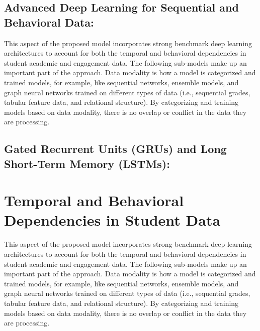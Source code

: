 \documentclass[twocolumn]{svjour3}
\begin{document}
\subsection{Advanced Deep Learning for Sequential and Behavioral Data:}
This aspect of the proposed model incorporates strong benchmark deep learning architectures to account for both the temporal and behavioral dependencies in student academic and engagement data. The following sub-models make up an important part of the approach. Data modality is how a model is categorized and trained models, for example, like sequential networks, ensemble models, and graph neural networks trained on different types of data (i.e., sequential grades, tabular feature data, and relational structure). By categorizing and training models based on data modality, there is no overlap or conflict in the data they are processing.
\subsection{Gated Recurrent Units (GRUs) and Long Short-Term Memory (LSTMs):}

\section{Temporal and Behavioral Dependencies in Student Data}
This aspect of the proposed model incorporates strong benchmark deep learning architectures to account for both the temporal and behavioral dependencies in student academic and engagement data. The following sub-models make up an important part of the approach. Data modality is how a model is categorized and trained models, for example, like sequential networks, ensemble models, and graph neural networks trained on different types of data (i.e., sequential grades, tabular feature data, and relational structure). By categorizing and training models based on data modality, there is no overlap or conflict in the data they are processing.
\end{document}
